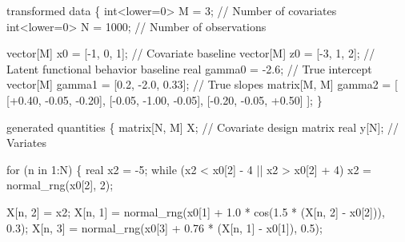 \documentclass[
  letterpaper,
  DIV=11,
  numbers=noendperiod]{scrartcl}
\newenvironment{Shaded}{\begin{snugshade}}{\end{snugshade}}
\newcommand{\CommentTok}[1]{\textcolor[rgb]{0.37,0.37,0.37}{#1}}
\newcommand{\ControlFlowTok}[1]{\textcolor[rgb]{0.00,0.23,0.31}{#1}}
\newcommand{\DataTypeTok}[1]{\textcolor[rgb]{0.68,0.00,0.00}{#1}}
\newcommand{\DecValTok}[1]{\textcolor[rgb]{0.68,0.00,0.00}{#1}}
\newcommand{\FloatTok}[1]{\textcolor[rgb]{0.68,0.00,0.00}{#1}}
\newcommand{\KeywordTok}[1]{\textcolor[rgb]{0.00,0.23,0.31}{#1}}
\newcommand{\NormalTok}[1]{\textcolor[rgb]{0.00,0.23,0.31}{#1}}
\begin{document}
\begin{Shaded}
\begin{Highlighting}[]
\KeywordTok{transformed data}\NormalTok{ \{}
  \DataTypeTok{int}\NormalTok{\textless{}}\KeywordTok{lower}\NormalTok{=}\DecValTok{0}\NormalTok{\textgreater{} M = }\DecValTok{3}\NormalTok{;         }\CommentTok{// Number of covariates}
  \DataTypeTok{int}\NormalTok{\textless{}}\KeywordTok{lower}\NormalTok{=}\DecValTok{0}\NormalTok{\textgreater{} N = }\DecValTok{1000}\NormalTok{;      }\CommentTok{// Number of observations}
  
  \DataTypeTok{vector}\NormalTok{[M] x0 = [{-}}\DecValTok{1}\NormalTok{, }\DecValTok{0}\NormalTok{, }\DecValTok{1}\NormalTok{]\textquotesingle{}; }\CommentTok{// Covariate baseline}
  \DataTypeTok{vector}\NormalTok{[M] z0 = [{-}}\DecValTok{3}\NormalTok{, }\DecValTok{1}\NormalTok{, }\DecValTok{2}\NormalTok{]\textquotesingle{}; }\CommentTok{// Latent functional behavior baseline}
  \DataTypeTok{real}\NormalTok{ gamma0 = {-}}\FloatTok{2.6}\NormalTok{;                      }\CommentTok{// True intercept}
  \DataTypeTok{vector}\NormalTok{[M] gamma1 = [}\FloatTok{0.2}\NormalTok{, {-}}\FloatTok{2.0}\NormalTok{, }\FloatTok{0.33}\NormalTok{]\textquotesingle{};   }\CommentTok{// True slopes}
  \DataTypeTok{matrix}\NormalTok{[M, M] gamma2 = [ [+}\FloatTok{0.40}\NormalTok{, {-}}\FloatTok{0.05}\NormalTok{, {-}}\FloatTok{0.20}\NormalTok{],}
\NormalTok{                          [{-}}\FloatTok{0.05}\NormalTok{, {-}}\FloatTok{1.00}\NormalTok{, {-}}\FloatTok{0.05}\NormalTok{],}
\NormalTok{                          [{-}}\FloatTok{0.20}\NormalTok{, {-}}\FloatTok{0.05}\NormalTok{, +}\FloatTok{0.50}\NormalTok{] ];}
\NormalTok{\}}

\KeywordTok{generated quantities}\NormalTok{ \{}
  \DataTypeTok{matrix}\NormalTok{[N, M] X; }\CommentTok{// Covariate design matrix}
  \DataTypeTok{real}\NormalTok{ y[N];      }\CommentTok{// Variates}

  \ControlFlowTok{for}\NormalTok{ (n }\ControlFlowTok{in} \DecValTok{1}\NormalTok{:N) \{}
    \DataTypeTok{real}\NormalTok{ x2 = {-}}\DecValTok{5}\NormalTok{;}
    \ControlFlowTok{while}\NormalTok{ (x2 \textless{} x0[}\DecValTok{2}\NormalTok{] {-} }\DecValTok{4}\NormalTok{ || x2 \textgreater{} x0[}\DecValTok{2}\NormalTok{] + }\DecValTok{4}\NormalTok{)}
\NormalTok{      x2 = normal\_rng(x0[}\DecValTok{2}\NormalTok{], }\DecValTok{2}\NormalTok{);}
    
\NormalTok{    X[n, }\DecValTok{2}\NormalTok{] = x2;}
\NormalTok{    X[n, }\DecValTok{1}\NormalTok{] = normal\_rng(x0[}\DecValTok{1}\NormalTok{] + }\FloatTok{1.0}\NormalTok{ * cos(}\FloatTok{1.5}\NormalTok{ * (X[n, }\DecValTok{2}\NormalTok{] {-} x0[}\DecValTok{2}\NormalTok{])), }\FloatTok{0.3}\NormalTok{);}
\NormalTok{    X[n, }\DecValTok{3}\NormalTok{] = normal\_rng(x0[}\DecValTok{3}\NormalTok{] + }\FloatTok{0.76}\NormalTok{ * (X[n, }\DecValTok{1}\NormalTok{] {-} x0[}\DecValTok{1}\NormalTok{]), }\FloatTok{0.5}\NormalTok{);}


\end{Highlighting}
\end{Shaded}
\end{document}
